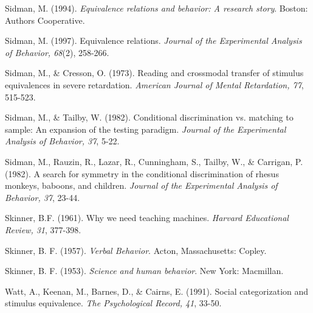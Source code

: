 \hangindent=25pt
\noindent Sidman, M. (1994). \textit{Equivalence relations and behavior: A research story}. Boston: Authors Cooperative.

\hangindent=25pt
\noindent Sidman, M. (1997). Equivalence relations. \textit{Journal of the Experimental Analysis of Behavior, 68}(2), 258-266.

\hangindent=25pt
\noindent Sidman, M., \& Cresson, O. (1973). Reading and crossmodal transfer of stimulus equivalences in severe retardation. \textit{American Journal of Mental Retardation, 77}, 515-523.

\hangindent=25pt
\noindent Sidman, M., \& Tailby, W. (1982). Conditional discrimination vs. matching to sample: An expansion of the testing paradigm. \textit{Journal of the Experimental Analysis of Behavior, 37}, 5-22.

\hangindent=25pt
\noindent Sidman, M., Rauzin, R., Lazar, R., Cunningham, S., Tailby, W., \& Carrigan, P. (1982). A search for symmetry in the conditional discrimination of rhesus monkeys, baboons, and children. \textit{Journal of the Experimental Analysis of Behavior, 37}, 23-44.

\hangindent=25pt
\noindent Skinner, B.F. (1961). Why we need teaching machines. \textit{Harvard Educational Review, 31}, 377-398. 

\hangindent=25pt
\noindent Skinner, B. F. (1957). \textit{Verbal Behavior}. Acton, Massachusetts: Copley.

\hangindent=25pt
\noindent Skinner, B. F. (1953). \textit{Science and human behavior}. New York: Macmillan. 

\hangindent=25pt
\noindent Watt, A., Keenan, M., Barnes, D., \& Cairns, E. (1991). Social categorization and stimulus equivalence. \textit{The Psychological Record, 41}, 33-50.
